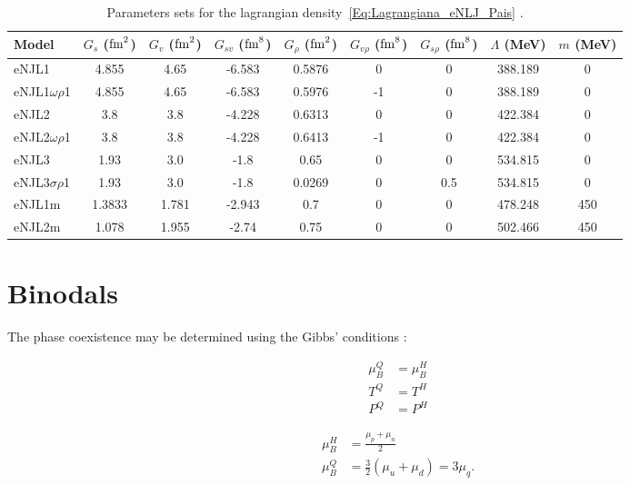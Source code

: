 \documentclass[plainsections,alongposter]{sciposterlocal}
\begin{document}
\begin{multicols}{2}
\begin{table}
\centering
\caption{Parameters sets for the lagrangian density~\eqref{Eq:Lagrangiana_eNLJ_Pais} \cite{Pais2016}. \label{Tab:Parametros_eNJL}}
\begin{tabular}{lcccccccc}
\toprule
Model & $G_s$ ($\rm{fm}^2$) & $G_v$ ($\rm{fm}^2$) & $G_{sv}$ ($\rm{fm}^8$) & $G_\rho$ ($\rm{fm}^2$) & $G_{v\rho}$ ($\rm{fm}^8$) & $G_{s\rho}$ ($\rm{fm}^8$) & $\Lambda$ (MeV) & $m$ (MeV) \\
\midrule
eNJL1 & 4.855 & 4.65 & -6.583 & 0.5876 & 0 & 0 & 388.189 & 0 \\
eNJL1$\omega\rho$1 & 4.855 & 4.65 & -6.583 & 0.5976 & -1 & 0 & 388.189 & 0 \\
eNJL2 & 3.8 & 3.8 & -4.228 & 0.6313 & 0 & 0 & 422.384 & 0 \\
eNJL2$\omega\rho$1 & 3.8 & 3.8 & -4.228 & 0.6413 & -1 & 0 & 422.384 & 0 \\
eNJL3 & 1.93 & 3.0 & -1.8 & 0.65 & 0 & 0 & 534.815 & 0 \\
eNJL3$\sigma\rho$1 & 1.93 & 3.0 & -1.8 & 0.0269 & 0 & 0.5 & 534.815 & 0 \\
eNJL1m & 1.3833 & 1.781 & -2.943 & 0.7 & 0 & 0 & 478.248 & 450 \\
eNJL2m & 1.078 & 1.955 & -2.74 & 0.75 & 0 & 0 & 502.466 & 450 \\
\bottomrule
\end{tabular}
\end{table}

\columnbreak

\section*{Binodals}

The phase coexistence may be determined using the Gibbs' conditions \cite{Cavagnoli2011}:

\begin{minipage}{0.5\columnwidth}
\begin{align*}
\mu_B^Q &= \mu_B^H\\
T^Q &= T^H \\
P^Q &= P^H
\end{align*}
\end{minipage}
\begin{minipage}{0.5\columnwidth}
\begin{align*}
	\mu_B^H &= \frac{\mu_p + \mu_n}{2} \\
	\mu_B^Q &= \frac{3}{2} (\mu_u + \mu_d) = 3 \mu_q.
\end{align*}
\end{minipage}


\end{multicols}
\end{document}

